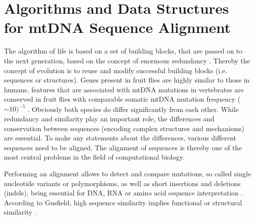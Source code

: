 \chapter{Algorithms and Data Structures for mtDNA Sequence Alignment}
\label{chapterAlignment}
\label{chap:alignment}
The algorithm of life is based on a set of building blocks, that are passed on to the next generation, based on the concept of enormous redundancy \cite{DO90}. Thereby the concept of evolution is to reuse and modify successful building blocks (i.e. sequences or structures). Genes present in fruit flies are highly similar to those in humans, features that are associated with mtDNA mutations in vertebrates are conserved in fruit flies with comparable somatic mtDNA mutation frequency (${\sim 10})^{-5}$ \cite{Itsara2014}. Obviously both species do differ significantly from each other. While redundancy and similarity play an important role, the differences and conservation between sequences (encoding complex structures and mechanisms) are essential. To make any statements about the differences, various different sequences need to be aligned. The alignment of sequences is thereby one of the most central problems in the field of computational biology.

Performing an alignment allows to detect and compare mutations, so called single nucleotide variants or polymorphisms, as well as short insertions and deletions (indels), being essential for DNA, RNA or amino acid sequence interpretation \cite{Gusfield1997}. According to Gusfield, high sequence similarity implies functional or structural similarity  \cite{Gusfield1997}.  

